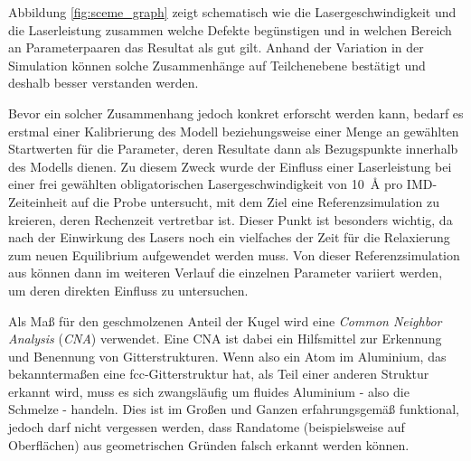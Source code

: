 		Abbildung \ref{fig:sceme_graph} zeigt schematisch wie die Lasergeschwindigkeit und
		die Laserleistung zusammen welche Defekte begünstigen und in welchen Bereich an
		Parameterpaaren das Resultat als gut gilt. Anhand der Variation in der Simulation
		können solche Zusammenhänge auf Teilchenebene bestätigt und deshalb besser verstanden
		werden.

		Bevor ein solcher Zusammenhang jedoch konkret erforscht werden kann, bedarf es erstmal
		einer Kalibrierung des Modell beziehungsweise einer Menge an gewählten Startwerten für die
		Parameter, deren Resultate dann als Bezugspunkte innerhalb des Modells dienen. Zu diesem
		Zweck wurde der Einfluss einer Laserleistung bei einer frei gewählten obligatorischen
		Lasergeschwindigkeit von \SI{10}{\angstrom} pro IMD-Zeiteinheit auf die Probe untersucht,
		mit dem Ziel eine Referenzsimulation zu kreieren, deren Rechenzeit vertretbar ist. Dieser
		Punkt ist besonders wichtig, da nach der Einwirkung des Lasers noch ein vielfaches der
		Zeit für die Relaxierung zum neuen Equilibrium aufgewendet werden muss. Von dieser
		Referenzsimulation aus können dann im weiteren Verlauf die einzelnen Parameter variiert
		werden, um deren direkten Einfluss zu untersuchen.

		Als Maß für den geschmolzenen Anteil der Kugel wird eine \emph{Common Neighbor Analysis}
		(\emph{CNA}) verwendet. Eine CNA ist dabei ein Hilfsmittel zur Erkennung und Benennung
		von Gitterstrukturen. Wenn also ein Atom im Aluminium, das bekanntermaßen eine
		fcc-Gitterstruktur hat, als Teil einer anderen Struktur erkannt wird, muss es sich
		zwangsläufig um fluides Aluminium - also die Schmelze - handeln. Dies ist im Großen und
		Ganzen erfahrungsgemäß funktional, jedoch darf nicht vergessen werden, dass Randatome
		(beispielsweise auf Oberflächen) aus geometrischen Gründen falsch erkannt werden können.

